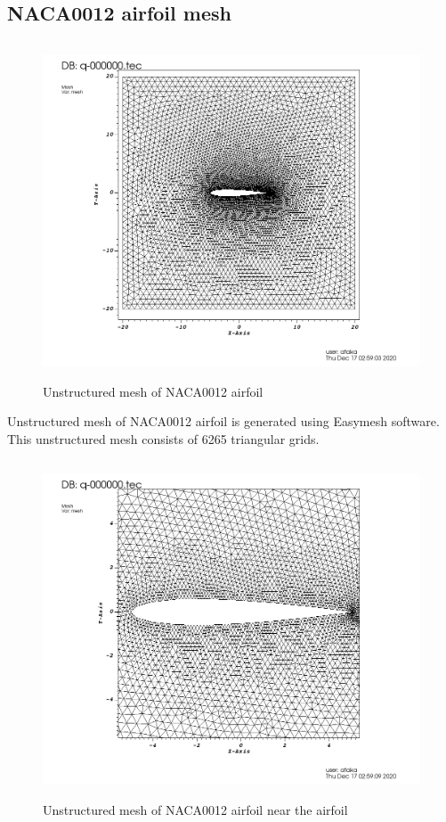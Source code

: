 \documentclass[letterpaper,12pt]{article}
\begin{document}
\newpage

\subsection{NACA0012 airfoil mesh}

\begin{figure} [!h]
	\centering
	\includegraphics[height = 10cm]{graph/medium/medium_62650000.png}
	\caption{Unstructured mesh of NACA0012 airfoil}
    \label{fig:airfoilmesh}
\end{figure}

\vspace{2cm}

Unstructured mesh of NACA0012 airfoil is generated using Easymesh software. This 
unstructured mesh consists of 6265 triangular grids.

\newpage

\begin{figure} [!h]
	\centering
	\includegraphics[height = 10cm]{graph/medium/medium_62650001.png}
	\caption{Unstructured mesh of NACA0012 airfoil near the airfoil}
    \label{fig:airfoilmeshclose}
\end{figure}
\end{document}
